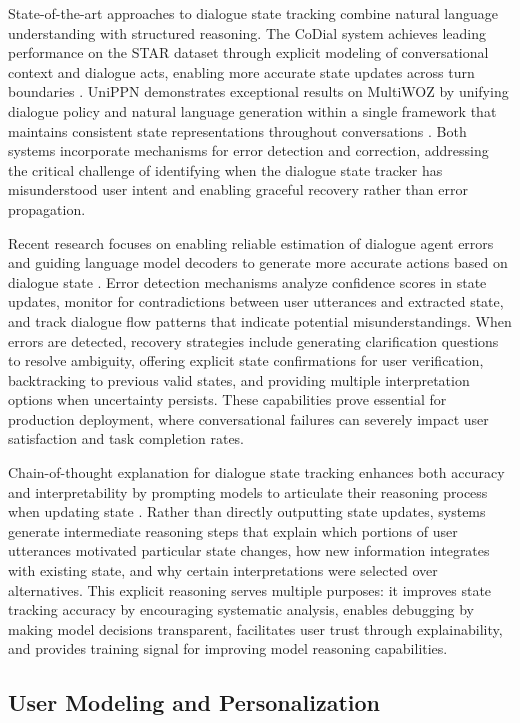 \documentclass[11pt,letterpaper]{article}
\begin{document}
State-of-the-art approaches to dialogue state tracking combine natural language understanding with structured reasoning. The CoDial system achieves leading performance on the STAR dataset through explicit modeling of conversational context and dialogue acts, enabling more accurate state updates across turn boundaries \cite{kim2024codial}. UniPPN demonstrates exceptional results on MultiWOZ by unifying dialogue policy and natural language generation within a single framework that maintains consistent state representations throughout conversations \cite{he2024unippn}. Both systems incorporate mechanisms for error detection and correction, addressing the critical challenge of identifying when the dialogue state tracker has misunderstood user intent and enabling graceful recovery rather than error propagation.

Recent research focuses on enabling reliable estimation of dialogue agent errors and guiding language model decoders to generate more accurate actions based on dialogue state \cite{zhao2025error}. Error detection mechanisms analyze confidence scores in state updates, monitor for contradictions between user utterances and extracted state, and track dialogue flow patterns that indicate potential misunderstandings. When errors are detected, recovery strategies include generating clarification questions to resolve ambiguity, offering explicit state confirmations for user verification, backtracking to previous valid states, and providing multiple interpretation options when uncertainty persists. These capabilities prove essential for production deployment, where conversational failures can severely impact user satisfaction and task completion rates.

Chain-of-thought explanation for dialogue state tracking enhances both accuracy and interpretability by prompting models to articulate their reasoning process when updating state \cite{li2024chain}. Rather than directly outputting state updates, systems generate intermediate reasoning steps that explain which portions of user utterances motivated particular state changes, how new information integrates with existing state, and why certain interpretations were selected over alternatives. This explicit reasoning serves multiple purposes: it improves state tracking accuracy by encouraging systematic analysis, enables debugging by making model decisions transparent, facilitates user trust through explainability, and provides training signal for improving model reasoning capabilities.

\subsection{User Modeling and Personalization}
\end{document}
